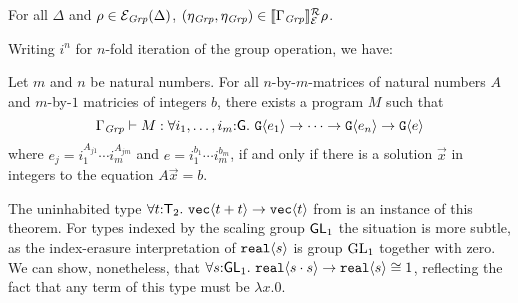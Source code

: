 \begin{lemma}
  For all $\Delta$ and $\rho \in \mathcal{E}_{\mathit{Grp}}(\Delta)$,
  $(\eta_{\mathit{Grp}},\eta_{\mathit{Grp}}) \in \llbracket \Gamma_{\mathit{Grp}} \rrbracket^{\mathcal{R}}_{\mathcal{E}}{\rho}$.
\end{lemma}

Writing $i^n$ for $n$-fold iteration of the group operation, we have:
\begin{theorem}
  Let $m$ and $n$ be natural numbers. For all $n$-by-$m$-matrices of
  natural numbers $A$ and $m$-by-$1$ matricies of integers $b$,
  there exists a program $M$ such that
  \begin{equation}
    \label{eq:fo-group-type}
    \Gamma_\Grp \vdash M : \forall i_1,\dots,i_m\mathord:\mathsf{G}.\ \tyPrim{G}{e_1} \to \dots \to \tyPrim{G}{e_n} \to \tyPrim{G}{e}
  \end{equation}
  where $e_j = i_1^{A_{j1}}\cdots i_m^{A_{jm}}$ and $e = i_1^{b_1}\cdots i_m^{b_m}$, if and only if there is a solution $\vec{x}$
  in integers to the equation $A \vec x = b$.
\end{theorem}
The uninhabited type  $\forall t \mathord:
  \mathsf{T}_2.\ \textup{\texttt{vec}}\langle t + t \rangle \to \textup{\texttt{vec}}\langle t \rangle$
from  is an instance of this theorem.
For types indexed by the scaling group $\mathsf{GL}_1$ the situation is more subtle, as
the index-erasure interpretation of $\textup{\texttt{real}}\langle s \rangle$ is group $\mathrm{GL}_1$ together with zero.
We can show, nonetheless, that $\forall s \mathord:
  \mathsf{GL}_1.\ \textup{\texttt{real}}\langle s \cdot s \rangle \to \textup{\texttt{real}}\langle s \rangle\cong 1$, reflecting 
the fact that any term of this type must be $\lambda x.0$.


